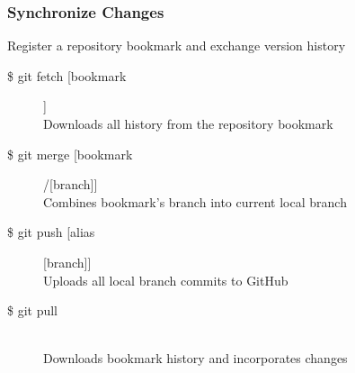 \subsubsection{Synchronize Changes}
Register a repository bookmark and exchange version history

\begin{description}

\item [\$ git fetch [bookmark]]\\
Downloads all history from the repository bookmark

\item [\$ git merge [bookmark]/[branch]]\\
Combines bookmark’s branch into current local branch

\item [\$ git push [alias][branch]]\\
Uploads all local branch commits to GitHub

\item [\$ git pull] \leavevmode \\
Downloads bookmark history and incorporates changes

\end{description}
